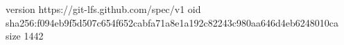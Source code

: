 version https://git-lfs.github.com/spec/v1
oid sha256:f094eb9f5d507c654f652cabfa71a8e1a192c82243c980aa646d4eb6248010ca
size 1442
